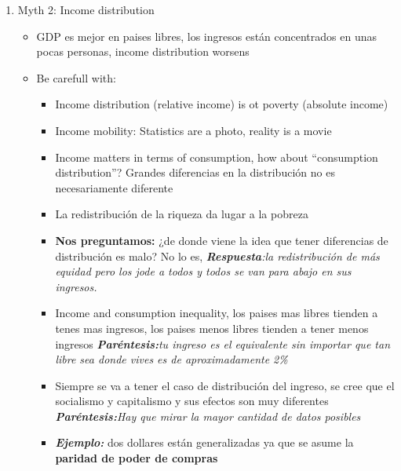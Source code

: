 \begin{enumerate}
    \item Myth 2: Income distribution
    \begin{itemize}
        \item GDP es mejor en paises libres, los ingresos están concentrados en unas pocas personas, income distribution worsens
        \item Be carefull with:
        \begin{itemize}
            \item Income distribution (relative income) is ot poverty (absolute income)
            \item Income mobility: Statistics are a photo, reality is a movie
            \item Income matters in terms of consumption, how about ``consumption distribution''? Grandes diferencias en la distribución no es necesariamente diferente
            \item La redistribución de la riqueza da lugar a la pobreza
            \item \textbf{Nos preguntamos:} ¿de donde viene la idea que tener diferencias de distribución es malo? No lo es, \emph{\textbf{Respuesta}:la redistribución de más equidad pero los jode a todos y todos se van para abajo en sus ingresos.}
            \item Income and consumption inequality, los paises mas libres tienden a tenes mas ingresos, los paises menos libres tienden a tener menos ingresos \emph{\textbf{Paréntesis:}tu ingreso es el equivalente sin importar que tan libre sea donde vives es de aproximadamente 2\%}
            \item Siempre se va a tener el caso de distribución del ingreso, se cree que el socialismo y capitalismo y sus efectos son muy diferentes \emph{\textbf{Paréntesis:}Hay que mirar la mayor cantidad de datos posibles}
            \item \textbf{\emph{Ejemplo:}} dos dollares están generalizadas ya que se asume la \textbf{paridad de poder de compras}
        \end{itemize}
    \end{itemize}


\end{enumerate}
